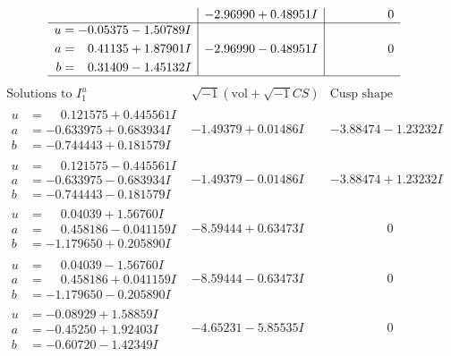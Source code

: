 \documentclass[1p]{elsarticle_modified}
\theoremstyle{definition}
\newcommand{\I}{\sqrt{-1}}
\begin{document}
$$\begin{array}{c|c|c}
 & -2.96990 + 0.48951 I & \phantom{-0.000000 } 0 \\ \hline\begin{aligned}
u &= -0.05375 - 1.50789 I \\
a &= \phantom{-}0.41135 + 1.87901 I \\
b &= \phantom{-}0.31409 - 1.45132 I\end{aligned}
 & -2.96990 - 0.48951 I & \phantom{-0.000000 } 0\\
 \hline 
 \end{array}$$\newpage$$\begin{array}{c|c|c}  
\text{Solutions to }I^u_{1}& \I (\text{vol} + \sqrt{-1}CS) & \text{Cusp shape}\\
 \hline 
\begin{aligned}
u &= \phantom{-}0.121575 + 0.445561 I \\
a &= -0.633975 + 0.683934 I \\
b &= -0.744443 + 0.181579 I\end{aligned}
 & -1.49379 + 0.01486 I & -3.88474 - 1.23232 I \\ \hline\begin{aligned}
u &= \phantom{-}0.121575 - 0.445561 I \\
a &= -0.633975 - 0.683934 I \\
b &= -0.744443 - 0.181579 I\end{aligned}
 & -1.49379 - 0.01486 I & -3.88474 + 1.23232 I \\ \hline\begin{aligned}
u &= \phantom{-}0.04039 + 1.56760 I \\
a &= \phantom{-}0.458186 - 0.041159 I \\
b &= -1.179650 + 0.205890 I\end{aligned}
 & -8.59444 + 0.63473 I & \phantom{-0.000000 } 0 \\ \hline\begin{aligned}
u &= \phantom{-}0.04039 - 1.56760 I \\
a &= \phantom{-}0.458186 + 0.041159 I \\
b &= -1.179650 - 0.205890 I\end{aligned}
 & -8.59444 - 0.63473 I & \phantom{-0.000000 } 0 \\ \hline\begin{aligned}
u &= -0.08929 + 1.58859 I \\
a &= -0.45250 + 1.92403 I \\
b &= -0.60720 - 1.42349 I\end{aligned}
 & -4.65231 - 5.85535 I & \phantom{-0.000000 } 0 \\ \hline\begin{aligned}

\end{aligned}
\end{array}$$
\end{document}
